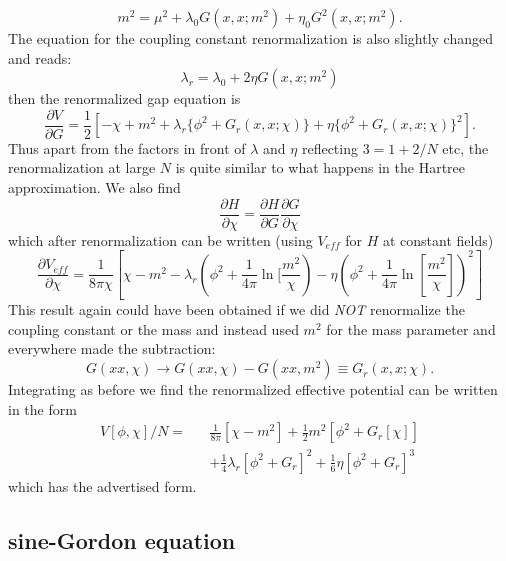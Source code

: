 \documentclass[a4paper,prd,preprint,superscriptaddress,showpacs,byrevtex]{revtex4}
\begin{document}
\begin{equation}
m^2 = \mu^2 + \lambda_0 G(x,x;m^2) + \eta_0 G^2(x,x;m^2).
\end{equation}
The equation for the coupling constant renormalization is also slightly
changed and reads:
\begin{equation}
\lambda_r = \lambda_0 + 2 \eta G(x,x;m^2)
\end{equation}
then the renormalized gap equation is
\begin{equation}
\frac {\partial V}{\partial G} = \frac{1}{2} [ -\chi + m^2  + \lambda_r \{
\phi^2 + G_r(x,x;\chi) \} + \eta  \{
\phi^2 + G_r(x,x;\chi)\}^2] .
\end{equation}
Thus apart from the factors in front of $\lambda$ and $\eta$  reflecting $3=
1+2/N$ etc, the renormalization at large $N$ is quite similar to what
happens
in the Hartree approximation.
We also find
 \begin{equation}  \frac{\partial
H} {\partial \chi} = \frac{\partial H} {\partial G} \frac{\partial G}
{\partial
\chi}  \end{equation} which after renormalization can be written (using
$V_{eff}$ for $H$ at constant fields)
\begin{equation}
\frac{\partial V_{eff}} {\partial \chi}= \frac{1} {8 \pi \chi} \left[\chi -
m^2 - \lambda_r \left(\phi^2
+\frac{1}{4
\pi} {\ln} [\frac{m^2}{\chi} \right) - \eta \left( \phi^2 +\frac{1}{4 \pi}
{\ln} [\frac{m^2}{\chi}] \right)^2  \right]
\end{equation}
This result  again could have been obtained if we did {\em NOT}
renormalize the coupling constant or the  mass and instead used $m^2$ for
the
mass parameter and everywhere made the subtraction: \begin{equation}
G(xx,\chi) \rightarrow G(xx, \chi) - G(xx, m^2) \equiv G_r(x,x;\chi).
\end{equation}
Integrating as before we find the renormalized effective potential can
be written in the form
\begin{eqnarray}
V[\phi,\chi]/N =&&\frac{1}{8 \pi} [ \chi - m^2]  + \frac{1}{2} m^2 [\phi^2
+G_r[\chi]] \nonumber \\
&& + \frac{1}{4} \lambda_r [\phi^2+G_r]^2 + \frac{1}{6} \eta[\phi^2 + G_r]^3
\end{eqnarray}
which has the advertised form.
\subsection{sine-Gordon equation}
\end{document}
